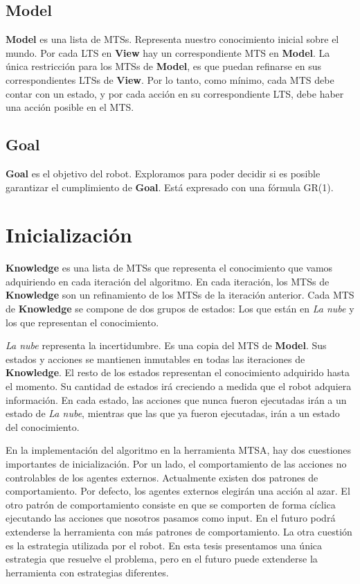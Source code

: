 \subsection{Model}
\textbf{Model} es una lista de MTSs. Representa nuestro conocimiento inicial sobre el mundo. Por cada LTS en \textbf{View} hay un correspondiente MTS 
en \textbf{Model}. 
La única restricción para los MTSs de \textbf{Model}, es que puedan refinarse en sus correspondientes LTSs de \textbf{View}. Por lo tanto, como mínimo, 
cada MTS debe contar con un estado, y por cada acción en su correspondiente LTS, debe haber una acción posible en el MTS.

\subsection{Goal}
\textbf{Goal} es el objetivo del robot. Exploramos para poder decidir si es posible garantizar el cumplimiento de \textbf{Goal}. Está expresado con una 
fórmula GR\big(1\big).

\section{Inicialización}

\textbf{Knowledge} es una lista de MTSs que representa el conocimiento que vamos adquiriendo en cada iteración del algoritmo. En cada iteración, los MTSs 
de \textbf{Knowledge} son un refinamiento de los MTSs de la iteración anterior. Cada MTS de \textbf{Knowledge} se compone de dos grupos de estados: Los 
que están en \textit{La nube} y los que representan el conocimiento.


\textit{La nube} representa la incertidumbre. Es una copia del MTS de \textbf{Model}. Sus estados y acciones se mantienen inmutables en todas las 
iteraciones de \textbf{Knowledge}. 
El resto de los estados representan el conocimiento adquirido hasta el momento. Su cantidad de estados irá creciendo a medida que el robot adquiera información. 
En cada estado, las acciones que nunca fueron ejecutadas irán a un estado de 
\textit{La nube}, mientras que las que ya fueron ejecutadas, irán a un estado 
del conocimiento.


En la implementación del algoritmo en la herramienta MTSA, hay dos cuestiones importantes de inicialización. 
Por un lado, el comportamiento de las acciones no controlables de los agentes externos. Actualmente existen dos patrones de comportamiento. 
Por defecto, los agentes externos elegirán una acción al azar. El otro patrón de comportamiento consiste en que se comporten de forma cíclica ejecutando 
las acciones que nosotros pasamos como input. En el futuro podrá extenderse la herramienta con más patrones de comportamiento. 
La otra cuestión es la estrategia utilizada por el robot. En esta tesis presentamos una única estrategia que resuelve el problema, pero en el futuro puede 
extenderse la herramienta con estrategias diferentes.

